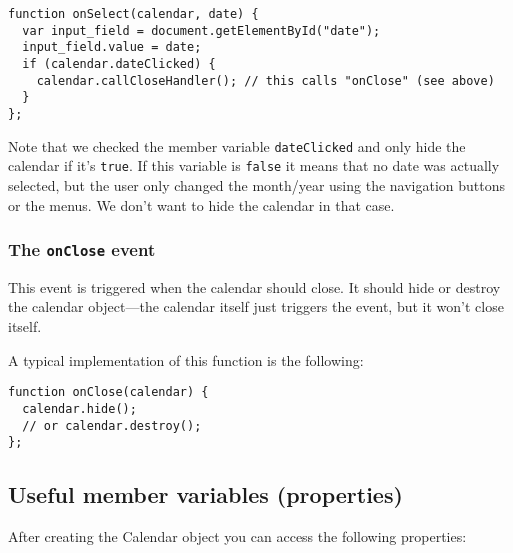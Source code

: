 \documentclass[a4paper,10pt]{article}
\begin{document}
\begin{verbatim}
function onSelect(calendar, date) {
  var input_field = document.getElementById("date");
  input_field.value = date;
  if (calendar.dateClicked) {
    calendar.callCloseHandler(); // this calls "onClose" (see above)
  }
};
\end{verbatim}

\noindent Note that we checked the member variable \texttt{dateClicked} and
only hide the calendar if it's \texttt{true}.  If this variable is \texttt{false} it
means that no date was actually selected, but the user only changed the
month/year using the navigation buttons or the menus.  We don't want to hide
the calendar in that case.

\subsubsection*{The \texttt{onClose} event}\label{sec:Calendar.onClose}

This event is triggered when the calendar should close.  It should hide or
destroy the calendar object---the calendar itself just triggers the event, but
it won't close itself.

A typical implementation of this function is the following:

\begin{verbatim}
function onClose(calendar) {
  calendar.hide();
  // or calendar.destroy();
};
\end{verbatim}

\subsection{Useful member variables (properties)}\label{sec:Calendar.props}

After creating the Calendar object you can access the following properties:
\end{document}
